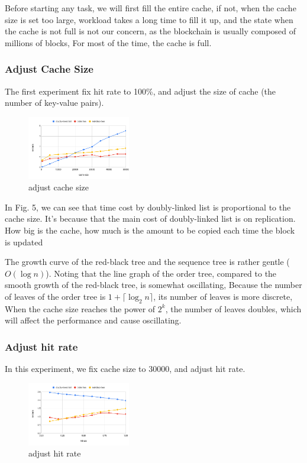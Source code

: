 \documentclass[conference]{IEEEtran}
\begin{document}
Before starting any task, we will first fill
the entire cache, if not, when the cache size is set too large,
workload takes a long time to fill it up,
and the state when the cache is not full is not our concern,
as the blockchain is usually composed of millions of blocks,
For most of the time, the cache is full.

\subsubsection{Adjust Cache Size}

The first experiment fix hit rate to 100\%,
and adjust the size of cache (the number of key-value pairs).

\begin{figure}
  \centering
  \includegraphics[width=0.4\textwidth]{adjust_cache_size.png}
  \caption{adjust cache size}
\end{figure}

In Fig. 5, we can see that time cost by doubly-linked list
is proportional to the cache size. It's because that
the main cost of doubly-linked list is on replication.
How big is the cache, how much is the amount to be copied each time the block is updated

The growth curve of the red-black tree and the sequence
tree is rather gentle ($O(\log n)$).
Noting that the line graph of the order tree,
compared to the smooth growth of the red-black tree,
is somewhat oscillating,
Because the number of leaves of the
order tree is $1 + \lceil \log_2 n \rceil$,
its number of leaves is more discrete,
When the cache size reaches the power of $2^k$,
the number of leaves doubles, which will affect
the performance and cause oscillating.

\subsubsection{Adjust hit rate}

In this experiment, we fix cache size to 30000, and adjust hit rate.

\begin{figure}
  \centering
  \includegraphics[width=0.4\textwidth]{adjust_hit_rate.png}
  \caption{adjust hit rate}
\end{figure}
\end{document}
